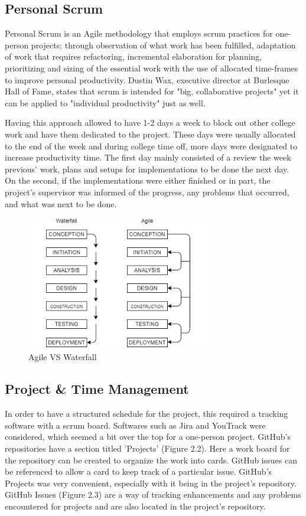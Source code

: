 \subsection{Personal Scrum}
Personal Scrum is an Agile methodology that employs scrum practices for one-person projects; through observation of what work has been fulfilled, adaptation of work that requires refactoring, incremental elaboration for planning, prioritizing and sizing of the essential work with the use of allocated time-frames to improve personal productivity.
Dustin Wax, executive director at Burlesque Hall of Fame, states that scrum is intended for "big, collaborative projects" yet it can be applied to "individual productivity" just as well. \cite{ref5}
 
Having this approach allowed to have 1-2 days a week to block out other college work and have them dedicated to the project. These days were usually allocated to the end of the week and during college time off, more days were designated to increase productivity time. The first day mainly consisted of a review the week previous' work, plans and setups for implementations to be done the next day. On the second, if the implementations were either finished or in part, the project's supervisor was informed of the progress, any problems that occurred, and what was next to be done.

\begin{figure}[H]
    \caption{Agile VS Waterfall}
    \label{image:agileVSwaterfall}
    \centering
    \includegraphics[width=0.72\textwidth]{images/misc/agile-vs-waterfall.png}
\end{figure}

\subsection{Project \& Time Management}
In order to have a structured schedule for the project, this required a tracking software with a scrum board. Softwares such as Jira and YouTrack were considered, which seemed a bit over the top for a one-person project. GitHub's repositories have a section titled 'Projects' (Figure 2.2). Here a work board for the repository can be created to organize the work into cards. GitHub issues can be referenced to allow a card to keep track of a particular issue. GitHub's Projects was very convenient, especially with it being in the project's repository. GitHub Issues (Figure 2.3) are a way of tracking enhancements and any problems encountered for projects and are also located in the project's repository.

